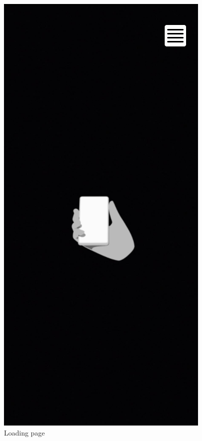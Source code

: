 \begin{figure}[h!]
    \begin{center}
        \includegraphics[scale=0.5]{img/App_mock/iPhone 14 - 1.png}
        \caption{Loading page}
        \label{fig:loading-page}
    \end{center}
\end{figure}
\pagebreak


